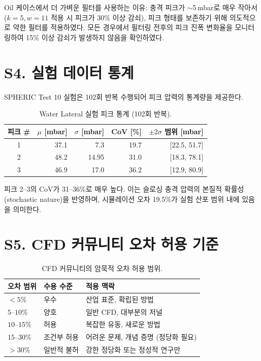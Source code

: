 \documentclass[a4paper,11pt]{article}
\begin{document}
Oil 케이스에서 더 가벼운 필터를 사용하는 이유:
충격 피크가 $\sim$5\,mbar로 매우 작아서 ($k=5, w=11$ 적용 시 피크가 30\% 이상 감쇠),
피크 형태를 보존하기 위해 의도적으로 약한 필터를 적용하였다.
모든 경우에서 필터링 전후의 피크 진폭 변화율을 모니터링하여
15\% 이상 감쇠가 발생하지 않음을 확인하였다.


\section{S4. 실험 데이터 통계} \label{sec:s4}

SPHERIC Test 10 실험은 102회 반복 수행되어 피크 압력의 통계량을 제공한다.

\begin{table}[h]
\caption{Water Lateral 실험 피크 통계 (102회 반복).}
\centering
\begin{tabular}{@{}crrrr@{}}
\toprule
피크 \# & $\mu$ [mbar] & $\sigma$ [mbar] & CoV [\%] & $\pm 2\sigma$ 범위 [mbar] \\
\midrule
1 & 37.1 & 7.3 & 19.7 & [22.5, 51.7] \\
2 & 48.2 & 14.95 & 31.0 & [18.3, 78.1] \\
3 & 46.9 & 17.0 & 36.2 & [12.9, 80.9] \\
\bottomrule
\end{tabular}
\end{table}

피크 2--3의 CoV가 31--36\%로 매우 높다. 이는 슬로싱 충격 압력의 본질적
확률성(stochastic nature)을 반영하며, 시뮬레이션 오차 19.5\%가
실험 산포 범위 내에 있음을 의미한다.


\section{S5. CFD 커뮤니티 오차 허용 기준} \label{sec:s5}

\begin{table}[h]
\caption{CFD 커뮤니티의 암묵적 오차 허용 범위.}
\centering
\begin{tabular}{@{}lll@{}}
\toprule
오차 범위 & 수용 수준 & 적용 맥락 \\
\midrule
$< 5\%$ & 우수 & 산업 표준, 확립된 방법 \\
$5$--$10\%$ & 양호 & 일반 CFD, 대부분의 저널 \\
$10$--$15\%$ & 허용 & 복잡한 유동, 새로운 방법 \\
$15$--$30\%$ & 조건부 허용 & 어려운 문제, 개념 증명 (정당화 필요) \\
$> 30\%$ & 일반적 불허 & 강한 정당화 또는 정성적 연구만 \\
\bottomrule
\end{tabular}
\end{table}
\end{document}
